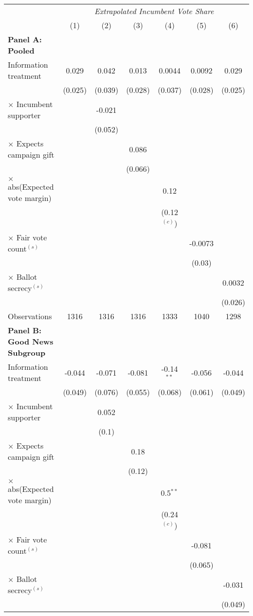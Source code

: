
    \begin{center}
    \begin{tabular}{l c c c c c c }
    \hline
    &\multicolumn{6}{c}{\emph{Extrapolated Incumbent Vote Share}}\\
    &(1)&(2)&(3)&(4)&(5)&(6)\\
    \hline
    \textbf{Panel A: Pooled}\\
    \hline
    Information treatment &0.029&0.042&0.013&0.0044&0.0092&0.029\\
    &(0.025)&(0.039)&(0.028)&(0.037)&(0.028)&(0.025)\\
    $\times$ Incumbent supporter & &-0.021& & & & \\
    & &(0.052)& & & & \\
    $\times$ Expects campaign gift & & &0.086 & & & \\
    & & &(0.066) & & & \\
    $\times$ abs(Expected vote margin) & & & &0.12& & \\
    & & & &(0.12$^{(c)}$)& & \\
    $\times$ Fair vote count$^{(s)}$ & & & & &-0.0073& \\
    & & & & &(0.03)& \\
    $\times$ Ballot secrecy$^{(s)}$ & & & & & &0.0032\\
    & & & & & &(0.026)\\
    Observations &1316&1316&1316&1333&1040&1298\\
    \hline
    \textbf{Panel B: Good News Subgroup}\\
    \hline
    Information treatment &-0.044&-0.071&-0.081&-0.14$^{**}$&-0.056&-0.044\\
    &(0.049)&(0.076)&(0.055)&(0.068)&(0.061)&(0.049)\\
    $\times$ Incumbent supporter & &0.052& & & & \\
    & &(0.1)& & & & \\
    $\times$ Expects campaign gift & & &0.18 & & & \\
    & & &(0.12) & & & \\
    $\times$ abs(Expected vote margin) & & & &0.5$^{**}$& & \\
    & & & &(0.24$^{(c)}$)& & \\
    $\times$ Fair vote count$^{(s)}$ & & & & &-0.081& \\
    & & & & &(0.065)& \\
    $\times$ Ballot secrecy$^{(s)}$ & & & & & &-0.031\\
    & & & & & &(0.049)\\

\end{tabular}
\end{center}
